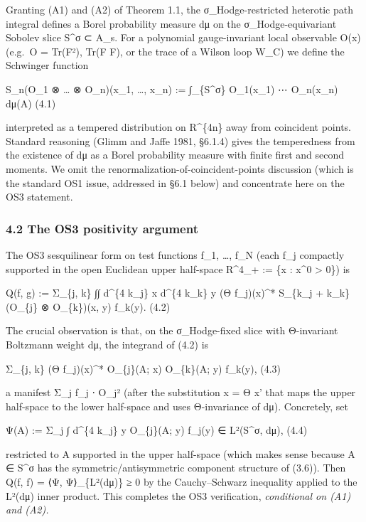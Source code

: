 \documentclass[
 11pt,
 a4paper,
]{article}
\begin{document}
Granting (A1) and (A2) of Theorem 1.1, the σ\_Hodge-restricted heterotic path integral defines a Borel probability measure dμ on the σ\_Hodge-equivariant Sobolev slice S\^{}σ ⊂ A\_s. For a polynomial gauge-invariant local observable O(x) (e.g.~O = Tr(F²), Tr(F F), or the trace of a Wilson loop W\_C) we define the Schwinger function

S\_n(O\_1 ⊗ \ldots{} ⊗ O\_n)(x\_1, \ldots, x\_n) := ∫\_\{S\^{}σ\} O\_1(x\_1) ⋯ O\_n(x\_n) dμ(A) (4.1)

interpreted as a tempered distribution on R\^{}\{4n\} away from coincident points. Standard reasoning (Glimm and Jaffe 1981, §6.1.4) gives the temperedness from the existence of dμ as a Borel probability measure with finite first and second moments. We omit the renormalization-of-coincident-points discussion (which is the standard OS1 issue, addressed in §6.1 below) and concentrate here on the OS3 statement.

\hypertarget{the-os3-positivity-argument}{%
\subsubsection{4.2 The OS3 positivity argument}\label{the-os3-positivity-argument}}

The OS3 sesquilinear form on test functions f\_1, \ldots, f\_N (each f\_j compactly supported in the open Euclidean upper half-space R\^{}4\_+ := \{x : x\^{}0 \textgreater{} 0\}) is

Q(f, g) := Σ\_\{j, k\} ∫∫ d\^{}\{4 k\_j\} x d\^{}\{4 k\_k\} y (Θ f\_j)(x)\^{}* S\_\{k\_j + k\_k\}(O\_\{j\} ⊗ O\_\{k\})(x, y) f\_k(y). (4.2)

The crucial observation is that, on the σ\_Hodge-fixed slice with Θ-invariant Boltzmann weight dμ, the integrand of (4.2) is

Σ\_\{j, k\} (Θ f\_j)(x)\^{}* O\_\{j\}(A; x) O\_\{k\}(A; y) f\_k(y), (4.3)

a manifest \textbar Σ\_j f\_j ⋅ O\_j\textbar² (after the substitution x = Θ x' that maps the upper half-space to the lower half-space and uses Θ-invariance of dμ). Concretely, set

Ψ(A) := Σ\_j ∫ d\^{}\{4 k\_j\} y O\_\{j\}(A; y) f\_j(y) ∈ L²(S\^{}σ, dμ), (4.4)

restricted to A supported in the upper half-space (which makes sense because A ∈ S\^{}σ has the symmetric/antisymmetric component structure of (3.6)). Then Q(f, f) = ⟨Ψ, Ψ⟩\_\{L²(dμ)\} ≥ 0 by the Cauchy--Schwarz inequality applied to the L²(dμ) inner product. This completes the OS3 verification, \emph{conditional on (A1) and (A2).}
\end{document}
